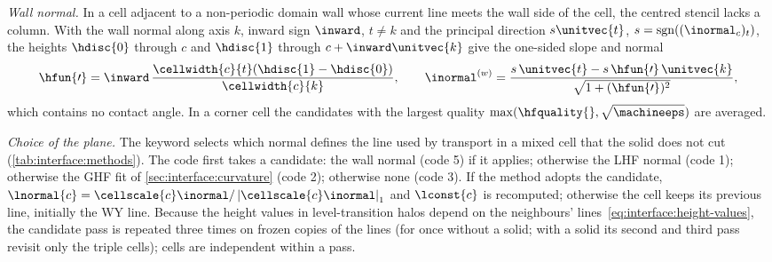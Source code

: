 \emph{Wall normal.} In a cell adjacent to a non-periodic domain wall whose
current line meets the wall side of the cell, the centred stencil lacks a column.
With the wall normal along axis $k$, inward sign $\inward$, $t\neq k$ and the
principal direction $s\unitvec{t}$, $s=\operatorname{sgn}((\inormal_c)_t)$, the
heights $\hdisc{0}$ through $c$ and $\hdisc{1}$ through $c+\inward\unitvec{k}$
give the one-sided slope and normal
\begin{equation}\label{eq:interface:wall-normal}
  \hfun{\prime}=\inward\,\frac{\cellwidth{c}{t}(\hdisc{1}-\hdisc{0})}{\cellwidth{c}{k}},\qquad
  \inormal^{(w)}=\frac{s\,\unitvec{t}-s\,\hfun{\prime}\,\unitvec{k}}{\sqrt{1+(\hfun{\prime})^2}},
\end{equation}
which contains no contact angle. In a corner cell the candidates with the
largest quality $\max(\hfquality{},\sqrt{\machineeps})$ are averaged.

\emph{Choice of the plane.} The keyword  selects
which normal defines the line used by transport in a mixed cell that the
solid does not cut (\cref{tab:interface:methods}). The code first takes a
candidate: the wall normal (code 5) if it applies; otherwise the LHF normal
(code 1); otherwise the GHF fit of \cref{sec:interface:curvature} (code 2);
otherwise none (code 3). If the method adopts the candidate,
$\lnormal{c}=\cellscale{c}\inormal/\abs{\cellscale{c}\inormal}_1$ and
$\lconst{c}$ is recomputed; otherwise the cell keeps its previous line,
initially the WY line. Because the height values in level-transition halos
depend on the neighbours' lines~\cref{eq:interface:height-values}, the
candidate pass is repeated three times on frozen copies of the lines (for
 once without a solid; with a solid its second and third pass
revisit only the triple cells); cells are independent within a pass.

